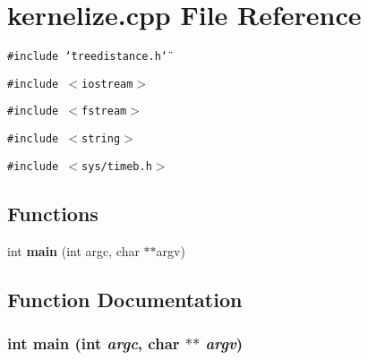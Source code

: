 \section{kernelize.cpp File Reference}
\label{kernelize_8cpp}
{\tt \#include \char`\"{}treedistance.h\char`\"{}}\par
{\tt \#include $<$iostream$>$}\par
{\tt \#include $<$fstream$>$}\par
{\tt \#include $<$string$>$}\par
{\tt \#include $<$sys/timeb.h$>$}\par
\subsection*{Functions}
\begin{CompactItemize}
\item 
int {\bf main} (int argc, char $\ast$$\ast$argv)
\end{CompactItemize}


\subsection{Function Documentation}
\subsubsection{\setlength{\rightskip}{0pt plus 5cm}int main (int {\em argc}, char $\ast$$\ast$ {\em argv})}\label{kernelize_8cpp_a0}


